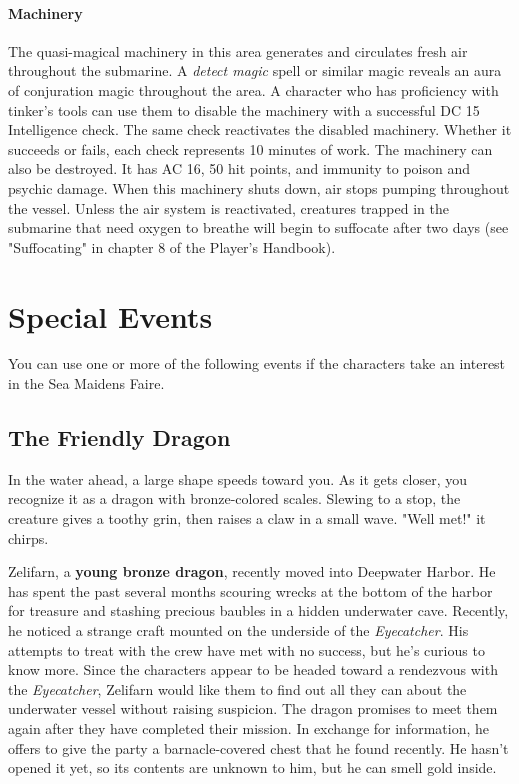 \documentclass[10pt,a4paper,twoside,twocolumn,openany,nodeprecatedcode]{dndbook}
\begin{document}
\paragraph{Machinery}
The quasi-magical machinery in this area generates and circulates fresh air throughout the submarine. A \textit{detect magic} spell or similar magic reveals an aura of conjuration magic throughout the area.
A character who has proficiency with tinker's tools can use them to disable the machinery with a successful DC 15 Intelligence check. The same check reactivates the disabled machinery. Whether it succeeds or fails, each check represents 10 minutes of work. The machinery can also be destroyed. It has AC 16, 50 hit points, and immunity to poison and psychic damage.
When this machinery shuts down, air stops pumping throughout the vessel. Unless the air system is reactivated, creatures trapped in the submarine that need oxygen to breathe will begin to suffocate after two days (see "Suffocating" in chapter 8 of the Player's Handbook).
\section{Special Events}
You can use one or more of the following events if the characters take an interest in the Sea Maidens Faire.
\subsection{The Friendly Dragon}
\begin{DndReadAloud}{}
In the water ahead, a large shape speeds toward you. As it gets closer, you recognize it as a dragon with bronze-colored scales. Slewing to a stop, the creature gives a toothy grin, then raises a claw in a small wave. "Well met!" it chirps.
\end{DndReadAloud}

Zelifarn, a \textbf{young bronze dragon}, recently moved into Deepwater Harbor. He has spent the past several months scouring wrecks at the bottom of the harbor for treasure and stashing precious baubles in a hidden underwater cave. Recently, he noticed a strange craft mounted on the underside of the \textit{Eyecatcher}. His attempts to treat with the crew have met with no success, but he's curious to know more. Since the characters appear to be headed toward a rendezvous with the \textit{Eyecatcher}, Zelifarn would like them to find out all they can about the underwater vessel without raising suspicion. The dragon promises to meet them again after they have completed their mission. In exchange for information, he offers to give the party a barnacle-covered chest that he found recently. He hasn't opened it yet, so its contents are unknown to him, but he can smell gold inside.
\end{document}
